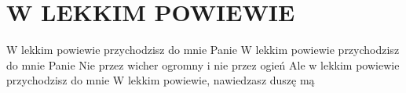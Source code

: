 \documentclass[../../../songbook.tex]{subfiles}
\begin{document}
\TabPositions{8cm} %
\section*{W LEKKIM POWIEWIE}
{}
\vspace{0.5cm}
W lekkim powiewie przychodzisz do mnie Panie	  \newline	
W lekkim powiewie przychodzisz do mnie Panie	  \newline	
Nie przez wicher ogromny i nie przez ogień		  \newline	
Ale w lekkim powiewie przychodzisz do mnie		  \newline	
W lekkim powiewie, nawiedzasz duszę mą			  \newline	 
\end{document}
